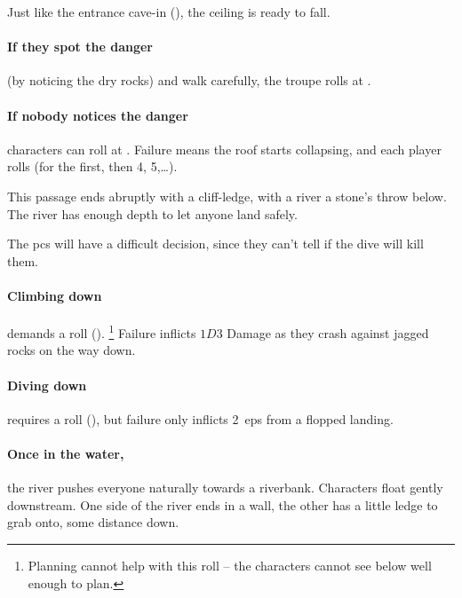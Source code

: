 \begin{multicols}{2}
Just like the entrance cave-in (), the ceiling is ready to fall.

\paragraph{If they spot the danger}
(by noticing the dry rocks) and walk carefully, the troupe rolls  at \tn[7].

\paragraph{If nobody notices the danger}
characters can roll  at \tn[10].
Failure means the roof starts collapsing, and each player rolls  (\tn[3] for the first, then 4, 5,\ldots).




This passage ends abruptly with a cliff-ledge, with a river a stone's throw below.
The river has enough depth to let anyone land safely.

The \glspl{pc} will have a difficult decision, since they can't tell if the dive will kill them.

\paragraph{Climbing down}
demands a  roll (\tn[9]).%
\footnote{Planning cannot help with this roll -- the characters cannot see below well enough to plan.}
Failure inflicts $1D3$ Damage as they crash against jagged rocks on the way down.

\paragraph{Diving down}
requires a  roll (\tn[10]), but failure only inflicts 2~\glspl{ep} from a flopped landing.

\paragraph{Once in the water,}
the river pushes everyone naturally towards a riverbank.
Characters float gently downstream.
One side of the river ends in a wall, the other has a little ledge to grab onto, some distance down.


\end{multicols}
